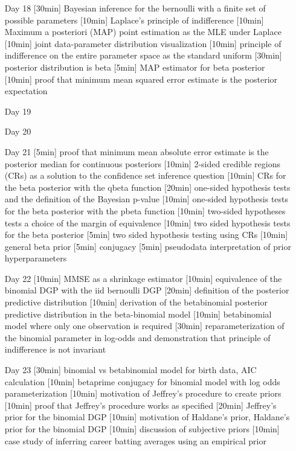 \begin{enumerate}
\item[Day 18] [30min] Bayesian inference for the bernoulli with a finite set of possible parameters [10min] Laplace's principle of indifference [10min] Maximum a posteriori (MAP) point estimation as the MLE under Laplace [10min] joint data-parameter distribution visualization [10min] principle of indifference on the entire parameter space as the standard uniform [30min] posterior distribution is beta [5min] MAP estimator for beta posterior [10min] proof that minimum mean squared error estimate is the posterior expectation


\item[Day 19] 
\item[Day 20] 

\item[Day 21] [5min] proof that minimum mean absolute error estimate is the posterior median for continuous posteriors [10min] 2-sided credible regions (CRs) as a solution to the confidence set inference question [10min] CRs for the beta posterior with the qbeta function [20min] one-sided hypothesis tests and the definition of the Bayesian p-value [10min] one-sided hypothesis tests for the beta posterior with the pbeta function [10min] two-sided hypotheses tests a choice of the margin of equivalence [10min] two sided hypothesis tests for the beta posterior [5min] two sided hypothesis testing using CRs [10min] general beta prior [5min] conjugacy [5min] pseudodata interpretation of prior hyperparameters 

\item[Day 22] [10min] MMSE as a shrinkage estimator [10min] equivalence of the binomial DGP with the iid bernoulli DGP [20min] definition of the posterior predictive distribution [10min] derivation of the betabinomial posterior predictive distribution in the beta-binomial model [10min] betabinomial model where only one observation is required [30min] reparameterization of the binomial parameter in log-odds and demonstration that principle of indifference is not invariant

\item[Day 23] [30min] binomial vs betabinomial model for birth data, AIC calculation [10min] betaprime conjugacy for binomial model with log odds parameterization [10min] motivation of Jeffrey's procedure to create priors [10min] proof that Jeffrey's procedure works as specified [20min] Jeffrey's prior for the binomial DGP [10min] motivation of Haldane's prior, Haldane's prior for the binomial DGP [10min] discussion of subjective priors [10min] case study of inferring career batting averages using an empirical prior


\end{enumerate}
